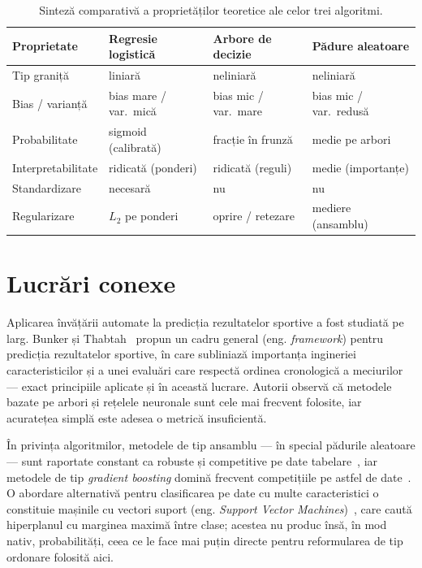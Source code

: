\documentclass[12pt,a4paper]{report}
\begin{document}
\begin{table}[htbp]
  \centering
  \begin{tabular}{l l l l}
    \toprule
    \textbf{Proprietate} & \textbf{Regresie logistică} & \textbf{Arbore de decizie} &
    \textbf{Pădure aleatoare} \\
    \midrule
    Tip graniță         & liniară            & neliniară            & neliniară          \\
    Bias / varianță     & bias mare / var.~mică & bias mic / var.~mare & bias mic / var.~redusă \\
    Probabilitate       & sigmoid (calibrată)  & fracție în frunză   & medie pe arbori    \\
    Interpretabilitate  & ridicată (ponderi)   & ridicată (reguli)   & medie (importanțe) \\
    Standardizare       & necesară             & nu                  & nu                 \\
    Regularizare        & $L_2$ pe ponderi     & oprire / retezare   & mediere (ansamblu) \\
    \bottomrule
  \end{tabular}
  \caption{Sinteză comparativă a proprietăților teoretice ale celor trei algoritmi.}
  \label{tab:comparatie}
\end{table}

\section{Lucrări conexe}
\label{sec:conexe}

Aplicarea învățării automate la predicția rezultatelor sportive a fost studiată pe larg. Bunker
și Thabtah~\cite{bunker2019machine} propun un cadru general (eng. \emph{framework}) pentru
predicția rezultatelor sportive, în care subliniază importanța ingineriei caracteristicilor și a
unei evaluări care respectă ordinea cronologică a meciurilor --- exact principiile aplicate și în
această lucrare. Autorii observă că metodele bazate pe arbori și rețelele neuronale sunt cele mai
frecvent folosite, iar acuratețea simplă este adesea o metrică insuficientă.

În privința algoritmilor, metodele de tip ansamblu --- în special pădurile aleatoare --- sunt
raportate constant ca robuste și competitive pe date tabelare~\cite{breiman2001random,
hastie2009elements}, iar metodele de tip \emph{gradient boosting} domină frecvent competițiile pe
astfel de date~\cite{friedman2001greedy, chen2016xgboost}. O abordare alternativă pentru
clasificarea pe date cu multe caracteristici o constituie mașinile cu vectori suport (eng.
\emph{Support Vector Machines})~\cite{cortes1995support}, care caută hiperplanul cu marginea
maximă între clase; acestea nu produc însă, în mod nativ, probabilități, ceea ce le face mai puțin
directe pentru reformularea de tip ordonare folosită aici.
\end{document}
